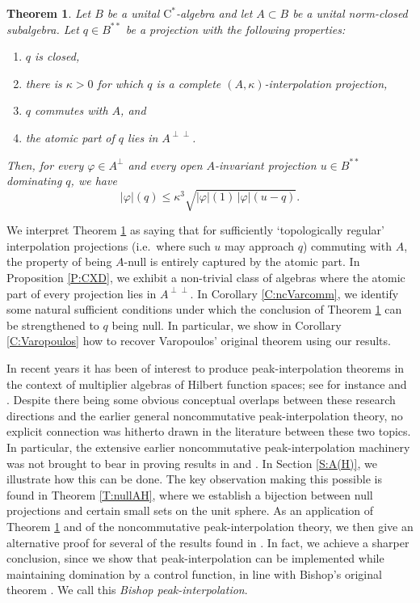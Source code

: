 \documentclass[10pt]{amsart}
\newcommand{\rC}{\mathrm{C}}
\renewcommand{\phi}{\varphi}
\newtheorem{theoremx}{Theorem}
\theoremstyle{definition}
\begin{document}
\begin{theoremx}\label{T:A}
 Let $B$ be a unital $\rC^*$-algebra and let $A\subset B$ be a unital norm-closed subalgebra.  Let $q\in B^{**}$ be a projection with the following properties:
 \begin{enumerate}[{\rm(i)}]
 \item $q$ is closed, 
 \item there is $\kappa>0$ for which $q$ is a complete $(A,\kappa)$-interpolation projection,
 \item $q$ commutes with $A$, and
 \item the atomic part of $q$ lies in $A^{\perp\perp}$.
\end{enumerate}
Then, for every $\phi\in A^\perp$  and every open $A$-invariant projection $u\in B^{**}$ dominating $q$, we have
\[
 |\phi|(q)\leq  \kappa^3 \sqrt{|\phi|(1)                                                                                                                                                                                                                                                                                                                                             \, | \phi|(u-q)}.
\]
\end{theoremx}

We interpret Theorem \ref{T:A} as saying that for sufficiently 
`topologically regular' interpolation projections
(i.e.\ where such $u$ may approach $q$)
commuting with $A$, the property of being $A$-null is entirely captured by the atomic part.  In Proposition \ref{P:CXD}, we exhibit a non-trivial class 
of algebras where the atomic part of every projection lies in $A^{\perp\perp}$. In Corollary \ref{C:ncVarcomm}, we identify some natural sufficient conditions under which the conclusion of Theorem \ref{T:A} can be strengthened to $q$ being null. In particular, we show in Corollary \ref{C:Varopoulos} how to recover Varopoulos' original theorem using our results.


In recent years it has been of interest to produce peak-interpolation theorems in the context of  multiplier algebras of Hilbert function spaces; see for instance 
\cite{CD2016duality} and \cite{DH2023}. Despite there being  some obvious conceptual overlaps between these research directions and the 
earlier general noncommutative peak-interpolation theory, no explicit connection was hitherto drawn in the literature between these two topics. In particular, the 
extensive  earlier 
noncommutative peak-interpolation machinery was not 
  brought to bear in proving results in \cite{CD2016duality} and \cite{DH2023}.  
  In Section \ref{S:A(H)}, we illustrate how this can be done. The key observation making this possible is found in Theorem \ref{T:nullAH}, where we establish a
   bijection between null projections and certain small sets on the unit sphere.  As an application of Theorem \ref{T:A} and of the noncommutative peak-interpolation theory, we then give an alternative proof for several of the results found in \cite{DH2023}. In fact, we achieve a sharper conclusion, since we show that peak-interpolation can be implemented  while maintaining domination by a control function, in line with Bishop's original theorem \cite{bishop1962}. We call this \emph{Bishop peak-interpolation}.  
  
\end{document}
